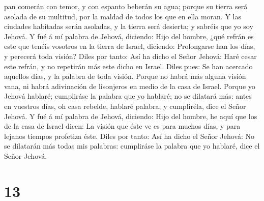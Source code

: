 pan comerán con temor, y con espanto beberán su agua; porque su tierra
será asolada de su multitud, por la maldad de todos los que en ella
moran.  Y las ciudades habitadas serán asoladas, y la
tierra será desierta; y sabréis que yo soy Jehová.  Y fué
á mí palabra de Jehová, diciendo:  Hijo del hombre, ¿qué
refrán es este que tenéis vosotros en la tierra de Israel, diciendo:
Prolongarse han los días, y perecerá toda visión?  Diles
por tanto: Así ha dicho el Señor Jehová: Haré cesar este refrán, y no
repetirán más este dicho en Israel. Diles pues: Se han acercado aquellos
días, y la palabra de toda visión.  Porque no habrá más
alguna visión vana, ni habrá adivinación de lisonjeros en medio de la
casa de Israel.  Porque yo Jehová hablaré; cumpliráse la
palabra que yo hablaré; no se dilatará más: antes en vuestros días, oh
casa rebelde, hablaré palabra, y cumpliréla, dice el Señor Jehová.
 Y fué á mí palabra de Jehová, diciendo: 
Hijo del hombre, he aquí que los de la casa de Israel dicen: La visión
que éste ve es para muchos días, y para lejanos tiempos profetiza éste.
 Diles por tanto: Así ha dicho el Señor Jehová: No se
dilatarán más todas mis palabras: cumpliráse la palabra que yo hablaré,
dice el Señor Jehová.

\hypertarget{section-12}{%
\section{13}\label{section-12}}

